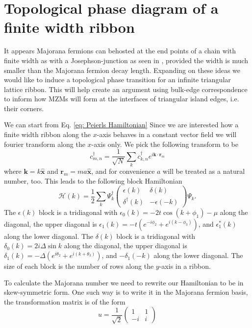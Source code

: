 \documentclass[aps,prb,showpacs,amsmath,amssymb,superscriptaddress]{revtex4-2}
\let\oldhat\hat
\renewcommand{\hat}[1]{\oldhat{\mathbf{#1}}}
\renewcommand{\vec}[1]{\mathbf{#1}}
\newcommand{\ham}{\mathcal{H}}
\newcommand{\cc}{c^{\dagger}}
\newcommand{\de}{\Delta}
\begin{document}
\section{Topological phase diagram of a finite width ribbon}

It appears Majorana fermions can behosted at the end points of a chain with finite width as with a Josephson-junction as seen in \cite{}, provided the width is much smaller than the Majorana fermion decay length.
Expanding on these ideas we would like to induce a topological phase transition for an infinite triangular lattice ribbon.
This will help create an argument using bulk-edge correspondence to inform how MZMs will form at the interfaces of triangular island edges, i.e. their corners.

We can start from Eq. \ref{eq: Peierls Hamiltonian}
Since we are interested how a finite width ribbon along the $x$-axis behaves in a constant vector field we will fourier transform along the $x$-axis only.
We pick the following transform to be
\begin{equation}
  \cc_{m,n} = \dfrac{1}{\sqrt{N}} \sum_{k} \cc_{k,n} e^{i \vec{k}\cdot\vec{r}_m}
\end{equation}
where $\vec{k}=k\hat{x}$ and $\vec{r}_m = ma\hat{x}$, and for convenience $a$ will be treated as a natural number, too.
This leads to the following block Hamiltonian
\begin{equation}
  \ham(k) = \dfrac{1}{2} \sum_k \Psi_k^\dagger \left(
    \begin{matrix}
      \epsilon(k) & \delta(k) \\
      \delta^\dagger(k) & -\epsilon(-k)
    \end{matrix} \right)
    \Psi_k.
\end{equation}
The $\epsilon(k)$ block is a tridiagonal with $\epsilon_0(k) = -2t\cos(k+\phi_1) - \mu$ along the diagonal, the upper diagonal is  $\epsilon_1(k) = -t(e^{-i\phi_2}+e^{i(k-\phi_3)})$, and $\epsilon_1^*(k)$ along the lower diagonal.
The $\delta(k)$ block is a tridiagonal with $\delta_0(k) = 2i\de \sin k $ along the diagonal, the upper diagonal is  $\delta_1(k) = -\de (e^{i\theta_2}+e^{i(k+\theta_3)})$, and $-\delta_1(-k)$ along the lower diagonal.
The size of each block is the number of rows along the $y$-axis in a ribbon.

To calculate the Majorana number we need to rewrite our Hamiltonian to be in skew-symmetric form.
One such way is to write it in the Majorana fermion basis, the transformation matrix is of the form
\begin{equation}
  u = \dfrac{1}{\sqrt{2}} \left(
  \begin{matrix}
    1 & 1 \\
    -i & i
  \end{matrix} \right)
\end{equation}
\end{document}
